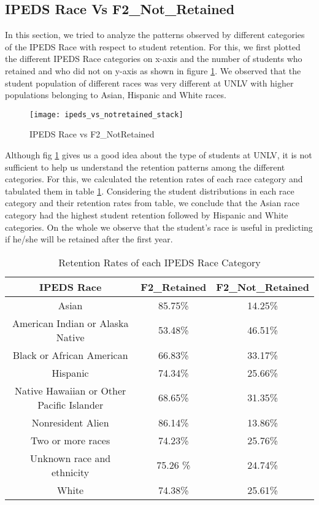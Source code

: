 \documentclass[11pt,openright]{report}
\begin{document}
\subsection {IPEDS Race Vs F2\_Not\_Retained}
In this section, we tried to analyze the patterns observed by different categories of the IPEDS Race with respect to student retention. For this, we first plotted the different IPEDS Race categories on x-axis and the number of students who retained and who did not on y-axis as shown in figure \ref{fig:ipeds_F2NotRetained_plot}. We observed that the student population of different races was very different at UNLV with higher populations belonging to Asian, Hispanic and White races.
\begin{figure}[!ht]
	\centering
	\texttt{[image: ipeds\_vs\_notretained\_stack]}
	\caption{IPEDS Race vs F2\_NotRetained}
	\label{fig:ipeds_F2NotRetained_plot}
\end{figure}

Although fig \ref{fig:ipeds_F2NotRetained_plot} gives us a good idea about the type of students at UNLV, it is not sufficient to help us understand the retention patterns among the different categories. For this, we calculated the retention rates of each race category and tabulated them in table \ref{table:ipeds_race_retentions}. Considering the student distributions in each race category and their retention rates from table, we conclude that the Asian race category had the highest student retention followed by Hispanic and White categories. On the whole we observe that the student's race is useful in predicting if he/she will be retained after the first year.

 \begin{table}[!t]
	\renewcommand{\arraystretch}{1.3}
	\caption{Retention Rates of each IPEDS Race Category}
	\label{table:ipeds_race_retentions}
	\centering
	\begin{tabular}{|c|c|c|}
		\hline
		\bfseries IPEDS Race & \bfseries F2\_Retained & \bfseries F2\_Not\_Retained\\
		\hline
		Asian & 85.75\% & 14.25\% \\ \hline
		American Indian or Alaska Native & 53.48\% & 46.51\% \\ \hline
		Black or African American & 66.83\% & 33.17\% \\ \hline
		Hispanic & 74.34\% & 25.66\% \\ \hline
		Native Hawaiian or Other Pacific Islander & 68.65\% & 31.35\% \\ \hline
		Nonresident Alien & 86.14\% & 13.86\% \\ \hline
		Two or more races &  74.23\% &  25.76\% \\ \hline
		Unknown race and ethnicity & 75.26 \% & 24.74\% \\ \hline
		White & 74.38\% & 25.61\% \\ \hline
	\end{tabular}
\end{table}
\end{document}
